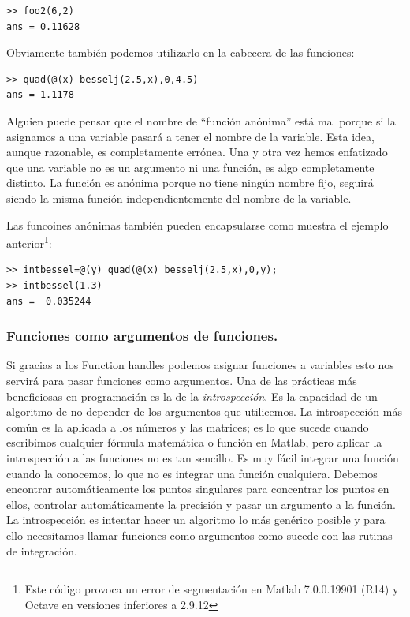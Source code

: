 \begin{verbatim}
>> foo2(6,2)
ans = 0.11628
\end{verbatim}
Obviamente también podemos utilizarlo en la cabecera de las funciones:

\begin{verbatim}
>> quad(@(x) besselj(2.5,x),0,4.5)
ans = 1.1178
\end{verbatim}
Alguien puede pensar que el nombre de {}``función anónima'' está mal
porque si la asignamos a una variable pasará a tener el nombre de la
variable. Esta idea, aunque razonable, es completamente errónea.  Una
y otra vez hemos enfatizado que una variable no es un argumento ni una
función, es algo completamente distinto. La función es anónima porque
no tiene ningún nombre fijo, seguirá siendo la misma función
independientemente del nombre de la variable.

Las funcoines anónimas también pueden encapsularse como muestra el
ejemplo anterior\footnote{Este código provoca un error de segmentación
en Matlab 7.0.0.19901 (R14) y Octave en versiones inferiores a
2.9.12}:

\begin{verbatim}
>> intbessel=@(y) quad(@(x) besselj(2.5,x),0,y);
>> intbessel(1.3)
ans =  0.035244
\end{verbatim}


\subsubsection{Funciones como argumentos de funciones.}

Si gracias a los Function handles podemos asignar funciones a
variables esto nos servirá para pasar funciones como argumentos. Una
de las prácticas más beneficiosas en programación es la de la
\emph{introspección}.  Es la capacidad de un
algoritmo de no depender de los argumentos que utilicemos. La
introspección más común es la aplicada a los números y las matrices;
es lo que sucede cuando escribimos cualquier fórmula matemática o
función en Matlab, pero aplicar la introspección a las funciones no es
tan sencillo. Es muy fácil integrar una función cuando la conocemos,
lo que no es integrar una función cualquiera. Debemos encontrar
automáticamente los puntos singulares para concentrar los puntos en
ellos, controlar automáticamente la precisión y pasar un argumento a
la función. La introspección es intentar hacer un algoritmo lo más
genérico posible y para ello necesitamos llamar funciones como
argumentos como sucede con las rutinas de integración.


